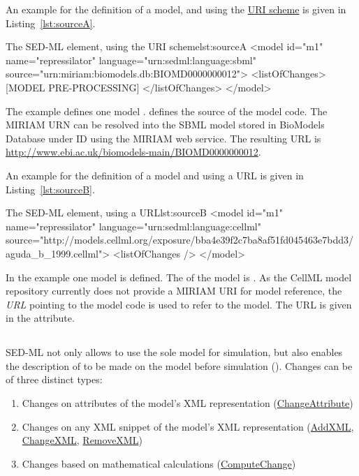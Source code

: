 An example for the definition of a model, and using the  \hyperref[sec:uriScheme]{URI scheme} is given in Listing~\ref{lst:sourceA}.

\begin{myXmlLst}{The SED-ML  element, using the URI scheme}{lst:sourceA}
 <model id="m1" name="repressilator" language="urn:sedml:language:sbml" 
  source="urn:miriam:biomodels.db:BIOMD0000000012">
  <listOfChanges>
   [MODEL PRE-PROCESSING]
  </listOfChanges>
 </model>
\end{myXmlLst}

The example defines one model .  defines the source of the model code. The MIRIAM URN can be resolved into the SBML model stored in BioModels Database under ID  using the MIRIAM web service. The resulting URL is \url{http://www.ebi.ac.uk/biomodels-main/BIOMD0000000012}.

An example for the definition of a model and using a URL is given in Listing~\ref{lst:sourceB}.

\begin{myXmlLst}{The SED-ML  element, using a URL}{lst:sourceB}
 <model id="m1" name="repressilator" language="urn:sedml:language:cellml" 
  source="http://models.cellml.org/exposure/bba4e39f2c7ba8af51fd045463e7bdd3/aguda_b_1999.cellml">
  <listOfChanges />
 </model>
\end{myXmlLst}

In the example one model is defined. The  of the model is . As the CellML model repository currently does not provide a MIRIAM URI for model reference, the \emph{URL} pointing to the model code is used to refer to the model. The URL is given in the  attribute.


\subsection[Change]{}
\label{class:change}
SED-ML not only allows to use the sole model for simulation, but also enables the description of  to be made on the model before simulation  (). Changes can be of three distinct types:
\begin{enumerate}
 \item{Changes on attributes of the model's XML representation (\hyperref[class:changeAttribute]{ChangeAttribute})}
 \item{Changes on any XML snippet of the model's XML representation (\hyperref[class:addXml]{AddXML}, \hyperref[class:changeXml]{ChangeXML}, \hyperref[class:removeXml]{RemoveXML})}
 \item{Changes based on mathematical calculations (\hyperref[class:computeChange]{ComputeChange})} 
 \end{enumerate}

